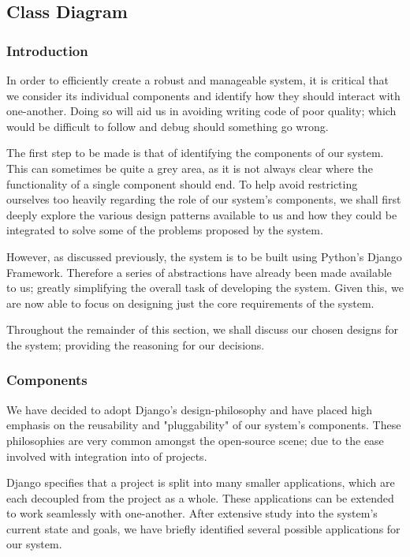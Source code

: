 \subsection{Class Diagram}
	\subsubsection{Introduction}
		In order to efficiently create a robust and manageable system, it is critical that we consider its individual components and identify how they should interact with one-another. Doing so will aid us in avoiding writing code of poor quality; which would be difficult to follow and debug should something go wrong.
		
		The first step to be made is that of identifying the components of our system. This can sometimes be quite a grey area, as it is not always clear where the functionality of a single component should end. To help avoid restricting ourselves too heavily regarding the role of our system's components, we shall first deeply explore the various design patterns available to us and how they could be integrated to solve some of the problems proposed by the system.
	
		However, as discussed previously, the system is to be built using Python's Django Framework.  Therefore a series of abstractions have already been made available to us; greatly simplifying the overall task of developing the system. Given this, we are now able to focus on designing just the core requirements of the system.
		
		Throughout the remainder of this section, we shall discuss our chosen designs for the system; providing the reasoning for our decisions.
	
	\subsubsection{Components}
		We have decided to adopt Django's design-philosophy and have placed high emphasis on the reusability and "pluggability" of our system's components. These philosophies are very common amongst the open-source scene; due to the ease involved with integration into of projects.
		
		Django specifies that a project is split into many smaller applications, which are each decoupled from the project as a whole. These applications can be extended to work seamlessly with one-another. After extensive study into the system's current state and goals, we have briefly identified several possible applications for our system.
		
